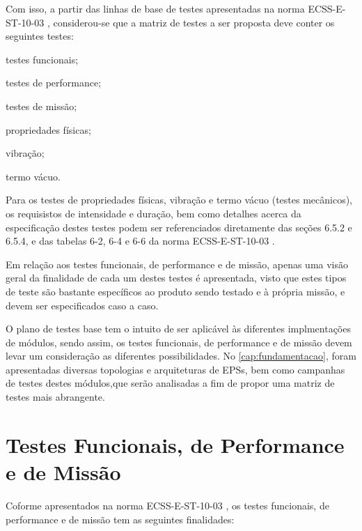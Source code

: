 
Com isso, a partir das linhas de base de testes apresentadas na norma ECSS-E-ST-10-03 \cite{ecss-e-st-10-03}, considerou-se que a matriz de testes a ser proposta deve conter os seguintes testes:

\begin{alineas}
    \item testes funcionais;
    \item testes de performance;
    \item testes de missão;
    \item propriedades físicas;
    \item vibração;
    \item termo vácuo.
\end{alineas}




Para os testes de propriedades físicas, vibração e termo vácuo (testes mecânicos), os requisistos de intensidade e duração, bem como detalhes acerca da especificação destes testes podem ser referenciados diretamente das seções 6.5.2 e 6.5.4, e das tabelas 6-2, 6-4 e 6-6 da norma ECSS-E-ST-10-03 \cite{ecss-e-st-10-03}.

Em relação aos testes funcionais, de performance e de missão, apenas uma visão geral da finalidade de cada um destes testes é apresentada, visto que estes tipos de teste são bastante específicos ao produto sendo testado e à própria missão, e devem ser especificados caso a caso.

O plano de testes base tem o intuito de ser aplicável às diferentes implmentações de módulos, sendo assim, os testes funcionais, de performance e de missão devem levar um consideração as diferentes possibilidades.
No \autoref{cap:fundamentacao}, foram apresentadas diversas topologias e arquiteturas de \gls{EPS}s, bem como campanhas de testes destes módulos,que serão analisadas a fim de propor uma matriz de testes mais abrangente.


\section{Testes Funcionais, de Performance e de Missão} \label{sec:analises-testes}

Coforme apresentados na norma ECSS-E-ST-10-03 \cite{ecss-e-st-10-03}, os testes funcionais, de performance e de missão tem as seguintes finalidades:

